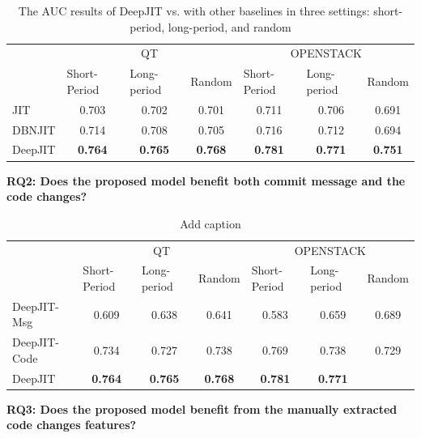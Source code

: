 \begin{table}[t!]
  \centering
  \caption{The AUC results of DeepJIT vs. with other baselines in three settings: short-period, long-period, and random}
    \begin{tabular}{|l|c|c|c|c|c|c|}
    \hline
    \multirow{2}[4]{*}{} & \multicolumn{3}{c|}{QT} & \multicolumn{3}{c|}{OPENSTACK} \\
\cline{2-7}          & \multicolumn{1}{l|}{Short-Period} & \multicolumn{1}{l|}{Long-period} & \multicolumn{1}{l|}{Random} & \multicolumn{1}{l|}{Short-Period} & \multicolumn{1}{l|}{Long-period} & \multicolumn{1}{l|}{Random} \\
    \hline
    \hline
    JIT   & 0.703 & 0.702 & 0.701 & 0.711 & 0.706 & 0.691 \\
    \hline
    DBNJIT & 0.714 & 0.708 & 0.705 & 0.716 & 0.712 & 0.694 \\
    \hline
    DeepJIT & \textbf{0.764} & \textbf{0.765} & \textbf{0.768} & \textbf{0.781} & \textbf{0.771} & \textbf{0.751} \\
    \hline
    \end{tabular}%
  \label{tab:addlabel}%
\end{table}%

\noindent \textbf{RQ2: Does the proposed model benefit both commit message and the code changes?}

\begin{table}[t!]
  \centering
  \caption{Add caption}
    \begin{tabular}{|l|c|c|c|c|c|c|}
    \hline
    \multirow{2}[4]{*}{} & \multicolumn{3}{c|}{QT} & \multicolumn{3}{c|}{OPENSTACK} \\
\cline{2-7}          & \multicolumn{1}{l|}{Short-Period} & \multicolumn{1}{l|}{Long-period} & \multicolumn{1}{l|}{Random} & \multicolumn{1}{l|}{Short-Period} & \multicolumn{1}{l|}{Long-period} & \multicolumn{1}{l|}{Random} \\
    \hline
    \hline
    DeepJIT-Msg & 0.609 & 0.638 & 0.641 & 0.583 & 0.659 & 0.689 \\
    \hline
    DeepJIT-Code & 0.734 & 0.727 & 0.738 & 0.769 & 0.738 & 0.729 \\
    \midrule
    DeepJIT & \textbf{0.764} & \textbf{0.765} & \textbf{0.768} & \textbf{0.781} & \textbf{0.771} \\
    \bottomrule
    \end{tabular}%
  \label{tab:addlabel}%
\end{table}%

\noindent \textbf{RQ3: Does the proposed model benefit from the manually extracted code changes features?}

